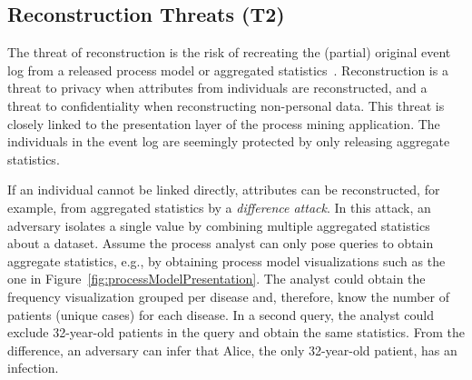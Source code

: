 \documentclass[manuscript]{acmart}
\begin{document}


\subsection{Reconstruction Threats (T2)}
The threat of reconstruction is the risk of recreating the (partial) original 
event log from a released process model or aggregated 
statistics~\cite{DinurN03}. Reconstruction is a threat to privacy when attributes from individuals are reconstructed, and a threat to confidentiality when reconstructing non-personal data. This threat is closely linked to the presentation layer of the process mining application. The individuals in the event log are seemingly protected by only releasing aggregate statistics. 

If an individual cannot be linked directly, attributes can be reconstructed, for example, from aggregated statistics by a \textit{difference attack}. 
In this attack, an adversary isolates a single value by combining multiple aggregated statistics about a dataset. Assume the process analyst can only pose queries to obtain aggregate statistics, e.g., by obtaining process model visualizations such as the one in Figure~\ref{fig:processModelPresentation}. The analyst could obtain the frequency visualization grouped per disease and, therefore, know the number of patients (unique cases) for each disease. In a second query, the analyst could exclude 32-year-old patients in the query and obtain the same statistics. From the difference, an adversary can infer that Alice, the only 32-year-old patient, has an infection. 
\end{document}

